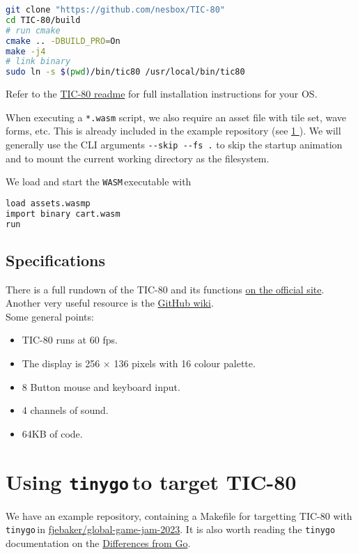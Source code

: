 \documentclass{article}
\newcommand{\tinygo}{\texttt{tinygo}\,}
\newcommand{\WASM}{\texttt{WASM}\,}
\newcommand{\fullref}[1]{\hyperref[{#1}]{\ref{#1} \nameref{#1}}}
\begin{document}
\begin{lstlisting}[language=Bash]
git clone "https://github.com/nesbox/TIC-80" 
cd TIC-80/build
# run cmake
cmake .. -DBUILD_PRO=On
make -j4
# link binary
sudo ln -s $(pwd)/bin/tic80 /usr/local/bin/tic80
\end{lstlisting}

\noindent Refer to the \href{https://github.com/nesbox/TIC-80}{TIC-80 readme} for full installation instructions for your OS.

When executing a \lstinline|*.wasm| script, we also require an asset file with tile set, wave forms, etc. This is already included in the example repository (see \fullref{sec:tinygo-tic80}). We will generally use the CLI arguments \lstinline|--skip --fs .| to skip the startup animation and to mount the current working directory as the filesystem. 

We load and start the \WASM executable with\\

\begin{lstlisting}[language=Bash]
load assets.wasmp 
import binary cart.wasm 
run
\end{lstlisting}

\subsection{Specifications}
\noindent There is a full rundown of the TIC-80 and its functions \href{https://tic80.com/learn}{on the official site}. Another very useful resource is the \href{https://github.com/nesbox/TIC-80/wiki}{GitHub wiki}.
\\[1em]
\noindent Some general points:
\begin{itemize}
    \item TIC-80 runs at 60 fps.
    \item The display is 256 $\times$ 136 pixels with 16 colour palette.
    \item 8 Button mouse and keyboard input.
    \item 4 channels of sound.
    \item 64KB of code.
\end{itemize}

\section{Using \tinygo to target TIC-80}\label{sec:tinygo-tic80}

We have an example repository, containing a Makefile for targetting TIC-80 with \tinygo in \href{https://github.com/fjebaker/global-game-jam-2023}{fjebaker/global-game-jam-2023}. It is also worth reading the \tinygo documentation on the \href{https://tinygo.org/docs/concepts/compiler-internals/differences-from-go/}{Differences from Go}. 
\end{document}
